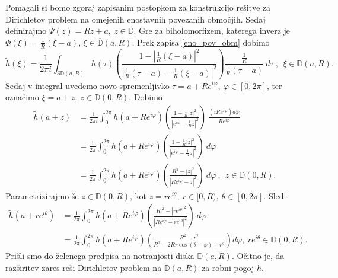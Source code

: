 \documentclass[mat1, tisk]{fmfdelo}
\begin{document}
     \begin{dokaz}
        Pomagali si bomo zgoraj zapisanim postopkom za konstrukcijo rešitve za \mbox{Dirichletov} problem na omejenih enostavnih povezanih območjih. 
        Sedaj definirajmo $\Psi(z) = Rz + a,~z \in \overline{\mathbb{D}}$. Gre za biholomorfizem, katerega inverz je \mbox{$\Phi(\xi) = \frac{1}{R}(\xi - a)$}, $\xi \in \overline{\mathbb{D}}(a,R)$.
        Prek zapisa \eqref{eno_pov_obm} dobimo
        $$ 
        \widetilde{h}(\xi) = \frac{1}{2\pi i}\int_{\partial \mathbb{D}(a,R)}{h(\tau) \left(\frac{1 - |\frac{1}{R}(\xi - a)|^2}{|\frac{1}{R}(\tau - a) - \frac{1}{R}(\xi - a)|^2}\right)\frac{\frac{1}{R}}{\frac{1}{R}(\tau - a)}~d \tau}~,~~\xi \in \mathbb{D}(a,R). 
        $$
        Sedaj v integral uvedemo novo spremenljivko $\tau = a + Re^{i \varphi},~\varphi \in [0,2\pi]$, ter označimo $\xi = a + z,~z \in \mathbb{D}(0, R)$. Dobimo
        \begin{align*}
            \widetilde{h}(a + z) &= \frac{1}{2\pi i}\int_{0}^{2 \pi}{h(a + R e^{i \varphi}) \left(\frac{1 - \frac{1}{R}|z|^2}{|e^{i \varphi} - \frac{1}{R} z|^2}\right)~\frac{(i R e^{i \varphi}) d \varphi}{R e^{i \varphi}}}\\
            & = \frac{1}{2 \pi}\int_{0}^{2 \pi}{h(a + R e^{i \varphi}) \left(\frac{1 - \frac{1}{R}|z|^2}{|e^{i \varphi} - \frac{1}{R} z|^2}\right)~d\varphi}\\
            & = \frac{1}{2 \pi}\int_{0}^{2 \pi}{h(a + R e^{i \varphi}) \left(\frac{R^2 - |z|^2}{|R e^{i \varphi} - z|^2}\right)~d\varphi}~,~~z \in \mathbb{D}(0,R).
        \end{align*}
        Parametrizirajmo še $z \in \mathbb{D}(0,R)$, kot $z = r e^{i \theta},~r \in [0,R),~\theta \in [0,2 \pi]$. Sledi
        \begin{align*}
            \widetilde{h}(a + r e^{i \theta}) &= \frac{1}{2 \pi}\int_{0}^{2 \pi}{h(a + R e^{i \varphi}) \left(\frac{|R|^2 - |r e^{i \theta}|^2}{|R e^{i \varphi} - r e^{i \theta}|^2}\right)~d\varphi} \\
            & = \frac{1}{2 \pi}\int_{0}^{2 \pi}{h(a + R e^{i \varphi}) \left(\frac{R^2 - r^2}{R^2 - 2Rr \cos(\theta - \varphi) + r^2}\right)d\varphi},~r e^{i \theta} \in \mathbb{D}(0,R).
        \end{align*}
        Prišli smo do želenega predpisa na notranjosti diska $\mathbb{D}(a,R)$. 
        Očitno je, da razširitev zares reši Dirichletov problem na $\mathbb{D}(a,R)$ za robni pogoj $h$.
     \end{dokaz}
\end{document}
